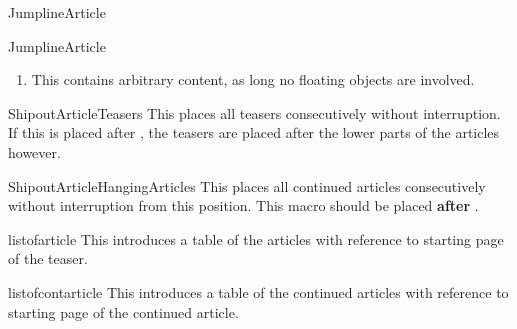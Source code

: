 \documentclass[12pt,english]{ltxdoc}
\newcommand{\myquotes}[1]{\enquote{#1}}%
\begin{document}
\begin{docCommand}{JumplineArticle}{}
\begin{docCommandArgs}{JumplineArticle}
\begin{enumerate}[label={\textcolor{blue}{\#\arabic*}}]
    \begin{docKey}{ContinuedOnTopskip}{=}
      This key value holds the vertical spacing between the splitted teaser and the line \textit{Continued on}.
    \end{docKey}

    \begin{docKey}{ContinuedOnBottomskip}{=}
      This key value holds the vertical spacing between the line \textit{Continued on} and the next possible teaser header.
    \end{docKey}


    \begin{docKey}{ArticleAuthor}{=\meta{}}{initially unset}
      This sets a (list of) the author name(s) -- it will be displayed at the bottom of the teaser only, introduced by \myquotes{\textit{By}}. 
   \end{docKey}


 \item {}
   This contains arbitrary content, as long no floating objects are involved. 
\end{enumerate}
\end{docCommandArgs}

\end{docCommand}%


\begin{docCommand}{ShipoutArticleTeasers}{}
This places all teasers consecutively without interruption. If this is placed after , the teasers are placed after the lower parts of the articles however.
\end{docCommand}

\begin{docCommand}{ShipoutArticleHangingArticles}{}
  This places all continued articles consecutively without interruption from this position. This macro should be placed \textbf{after} .
\end{docCommand}


\begin{docCommand}{listofarticle}{}
  This introduces a table of the articles with reference to starting page of the teaser.
\end{docCommand}

\begin{docCommand}{listofcontarticle}{}
  This introduces a table of the continued articles with reference to starting page of the continued article.
\end{docCommand}
\end{document}
